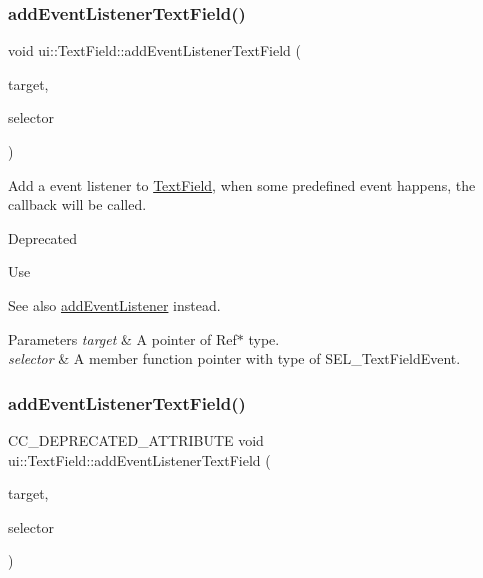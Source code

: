 \subsubsection{\texorpdfstring{add\+Event\+Listener\+Text\+Field()}{addEventListenerTextField()}\hspace{0.1cm}{\footnotesize\ttfamily [1/2]}}
{\footnotesize\ttfamily void ui\+::\+Text\+Field\+::add\+Event\+Listener\+Text\+Field (\begin{DoxyParamCaption}\item[{\hyperlink{classRef}{Ref} $\ast$}]{target,  }\item[{S\+E\+L\+\_\+\+Text\+Field\+Event}]{selector }\end{DoxyParamCaption})}

Add a event listener to \hyperlink{classui_1_1TextField}{Text\+Field}, when some predefined event happens, the callback will be called. \begin{DoxyRefDesc}{Deprecated}
\item[\hyperlink{deprecated__deprecated000165}{Deprecated}]Use\end{DoxyRefDesc}
\begin{DoxySeeAlso}{See also}
{\ttfamily \hyperlink{classui_1_1TextField_a2fb48806ef4efd12c4d7db8f58956509}{add\+Event\+Listener}} instead. 
\end{DoxySeeAlso}

\begin{DoxyParams}{Parameters}
{\em target} & A pointer of {\ttfamily Ref$\ast$} type. \\
\hline
{\em selector} & A member function pointer with type of {\ttfamily S\+E\+L\+\_\+\+Text\+Field\+Event}. \\
\hline
\end{DoxyParams}
\mbox{\label{classui_1_1TextField_a7ca15003baf609a5333d438e1baa97d3}} 
\subsubsection{\texorpdfstring{add\+Event\+Listener\+Text\+Field()}{addEventListenerTextField()}\hspace{0.1cm}{\footnotesize\ttfamily [2/2]}}
{\footnotesize\ttfamily C\+C\+\_\+\+D\+E\+P\+R\+E\+C\+A\+T\+E\+D\+\_\+\+A\+T\+T\+R\+I\+B\+U\+TE void ui\+::\+Text\+Field\+::add\+Event\+Listener\+Text\+Field (\begin{DoxyParamCaption}\item[{\hyperlink{classRef}{Ref} $\ast$}]{target,  }\item[{S\+E\+L\+\_\+\+Text\+Field\+Event}]{selector }\end{DoxyParamCaption})}

